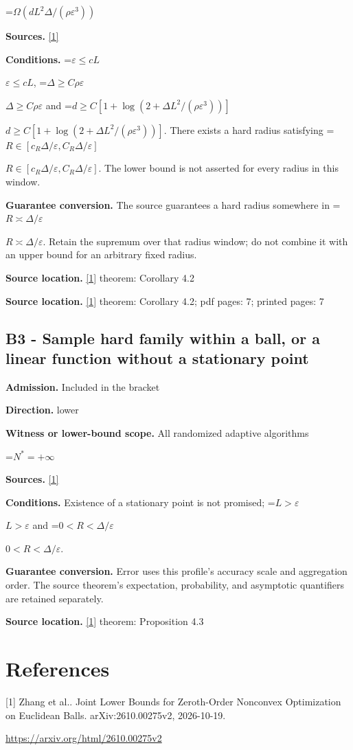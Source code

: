 \documentclass[10pt,a4paper]{article}
\newcommand{\AtlasMath}[1]{\par\begingroup\centering\setbox0=\hbox{$\displaystyle #1$}\ifdim\wd0>1.4\linewidth\typeout{ATLAS WIDE FORMULA: \the\wd0}\fi\ifdim\wd0>\linewidth\resizebox{\linewidth}{!}{\box0}\else\box0\fi\par\endgroup}
\newcommand{\AtlasInlineMath}[1]{\begingroup\setbox0=\hbox{$#1$}\ifdim\wd0>.4\linewidth\endgroup\AtlasMath{#1}\else\endgroup$#1$\fi}
\begin{document}
\AtlasMath{\Omega(dL^2\Delta/(\rho\varepsilon^3))}
\textbf{Sources.} \href{https://arxiv.org/html/2610.00275v2}{[1]}

\textbf{Conditions.} \AtlasInlineMath{\varepsilon\le cL}, \AtlasInlineMath{\Delta\ge C\rho\varepsilon} and \AtlasInlineMath{d\ge C[1+\log(2+\Delta L^2/(\rho\varepsilon^3))]}. There exists a hard radius satisfying \AtlasInlineMath{R\in[c_R\Delta/\varepsilon,C_R\Delta/\varepsilon]}. The lower bound is not asserted for every radius in this window.

\textbf{Guarantee conversion.} The source guarantees a hard radius somewhere in \AtlasInlineMath{R\asymp\Delta/\varepsilon}. Retain the supremum over that radius window; do not combine it with an upper bound for an arbitrary fixed radius.

\textbf{Source location.} \href{https://arxiv.org/html/2610.00275v2}{[1]} theorem: Corollary 4.2

\textbf{Source location.} \href{https://arxiv.org/html/2610.00275v2}{[1]} theorem: Corollary 4.2; pdf pages: 7; printed pages: 7

\subsection{B3 - Sample hard family within a ball, or a linear function without a stationary point}
\textbf{Admission.} Included in the bracket

\textbf{Direction.} lower

\textbf{Witness or lower-bound scope.} All randomized adaptive algorithms

\AtlasMath{N^*=+\infty}
\textbf{Sources.} \href{https://arxiv.org/html/2610.00275v2}{[1]}

\textbf{Conditions.} Existence of a stationary point is not promised; \AtlasInlineMath{L>\varepsilon} and \AtlasInlineMath{0<R<\Delta/\varepsilon}.

\textbf{Guarantee conversion.} Error uses this profile's accuracy scale and aggregation order. The source theorem's expectation, probability, and asymptotic quantifiers are retained separately.

\textbf{Source location.} \href{https://arxiv.org/html/2610.00275v2}{[1]} theorem: Proposition 4.3

\section{References}
[1] Zhang et al.. Joint Lower Bounds for Zeroth-Order Nonconvex Optimization on Euclidean Balls. arXiv:2610.00275v2, 2026-10-19.

\url{https://arxiv.org/html/2610.00275v2}
\end{document}
